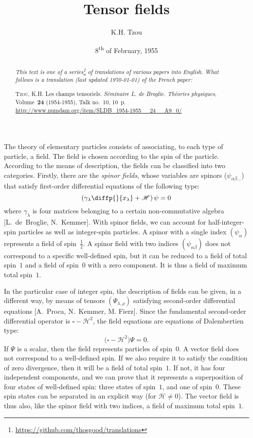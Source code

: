 \documentclass{article}
\newcommand{\HH}{\mathscr{H}}
\newcommand{\oldpage}[1]{\marginpar{\footnotesize$\Big\vert$ \textit{p.~#1}}}
\begin{document}
\renewcommand{\abstractname}{Translator's note.}

\title{Tensor fields}
\author{K.H. Tzou}
\date{8\textsuperscript{th} of February, 1955}
\maketitle

\begin{abstract}
  \renewcommand*{\thefootnote}{\fnsymbol{footnote}}
  \emph{This text is one of a series\footnote{\url{https://github.com/thosgood/translations}} of translations of various papers into English.}
  \emph{What follows is a translation (last updated \today) of the French paper:}

  \medskip\noindent
  \textsc{Tzou, K.H.} Les champs tensoriels. \emph{Séminaire L. de Broglie. Théories physiques}, Volume~\textbf{24} (1954-1955), Talk no.~10, 10~p. {\footnotesize\url{http://www.numdam.org/item/SLDB_1954-1955__24__A9_0/}}
\end{abstract}

\tableofcontents



\bigskip\bigskip
\oldpage{13-01}
The theory of elementary particles consists of associating, to each type of particle, a field.
The field is chosen according to the spin of the particle.
According to the means of description, the fields can be classified into two categories.
Firstly, there are the \emph{spinor fields}, whose variables are spinors ($\psi_{\alpha\beta\ldots}$) that satisfy first-order differential equations of the following type:
\[
  \left(\gamma_\lambda \diffp{}{{x_\lambda}} + \HH\right)\psi = 0
\]
where $\gamma_\lambda$ is four matrices belonging to a certain non-commutative algebra [L.~de~Broglie, N.~Kemmer].
With spinor fields, we can account for half-integer-spin particles as well as integer-spin particles.
A spinor with a single index $(\psi_\alpha)$ represents a field of spin~$\frac12$.
A spinor field with two indices $(\psi_{\alpha\beta})$ does not correspond to a specific well-defined spin, but it can be reduced to a field of total spin~$1$ and a field of spin~$0$ with a zero component.
It is thus a field of maximum total spin~$1$.

In the particular case of integer spin, the description of fields can be given, in a different way, by means of tensors $(\Psi_{\lambda,\rho})$ satisfying second-order differential equations [A.~Proca, N.~Kemmer, M. Fierz].
Since the fundamental second-order differential operator is $\square-\HH^2$, the field equations are equations of Dalembertien type:
\[
  \Big(\square-\HH^2\Big)\Psi = 0.
\]
If $\Psi$ is a scalar, then the field represents particles of spin~$0$.
A vector field does not correspond to a well-defined spin.
If we also require it to satisfy the condition of zero divergence, then it will be a field of total spin~$1$.
If not, it has four independent components, and we can prove that it represents a superposition of four states of well-defined spin: three states of spin~$1$, and one of spin~$0$.
These spin states can be separated in an explicit way (for $\HH\neq0$).
The vector field is thus also, like the spinor field with two indices,
\oldpage{13-02}
a field of maximum total spin~$1$.
\end{document}

